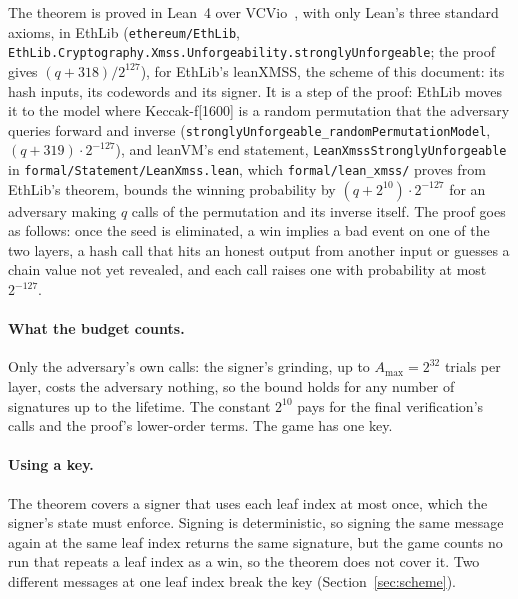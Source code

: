 \documentclass[11pt]{article}
\newcommand{\amax}{A_{\max}}
\begin{document}
The theorem is proved in Lean~4 over VCVio~\cite{VCVio}, with only Lean's three standard axioms, in EthLib (\texttt{ethereum/EthLib}, \texttt{EthLib.Cryptography.Xmss.Unforgeability.stronglyUnforgeable}; the proof gives $(q+318)/2^{127}$), for EthLib's leanXMSS, the scheme of this document: its hash inputs, its codewords and its signer. It is a step of the proof: EthLib moves it to the model where Keccak-f[1600] is a random permutation that the adversary queries forward and inverse (\texttt{stronglyUnforgeable\_randomPermutationModel}, $(q+319)\cdot2^{-127}$), and leanVM's end statement, \texttt{LeanXmssStronglyUnforgeable} in \texttt{formal/Statement/LeanXmss.lean}, which \texttt{formal/lean\_xmss/} proves from EthLib's theorem, bounds the winning probability by $(q+2^{10})\cdot2^{-127}$ for an adversary making $q$ calls of the permutation and its inverse itself. The proof goes as follows: once the seed is eliminated, a win implies a bad event on one of the two layers, a hash call that hits an honest output from another input or guesses a chain value not yet revealed, and each call raises one with probability at most $2^{-127}$.

\paragraph{What the budget counts.} Only the adversary's own calls: the signer's grinding, up to $\amax=2^{32}$ trials per layer, costs the adversary nothing, so the bound holds for any number of signatures up to the lifetime. The constant $2^{10}$ pays for the final verification's calls and the proof's lower-order terms. The game has one key.

\paragraph{Using a key.} The theorem covers a signer that uses each leaf index at most once, which the signer's state must enforce. Signing is deterministic, so signing the same message again at the same leaf index returns the same signature, but the game counts no run that repeats a leaf index as a win, so the theorem does not cover it. Two different messages at one leaf index break the key (Section~\ref{sec:scheme}).
\end{document}
